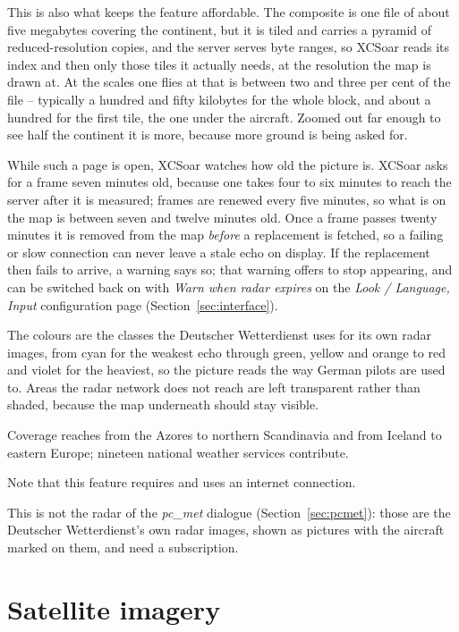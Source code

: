 This is also what keeps the feature affordable.  The composite is one
file of about five megabytes covering the continent, but it is
tiled and carries a pyramid of reduced-resolution copies, and the
server serves byte ranges, so XCSoar reads its index and then only
those tiles it actually needs, at the resolution the map is drawn at.
At the scales one flies at that is between two and three per cent of
the file -- typically a hundred and fifty kilobytes for the whole
block, and about a hundred for the first tile, the one under the
aircraft.  Zoomed out far enough to see half the continent it is more,
because more ground is being asked for.

While such a page is open, XCSoar watches how old the picture is.
XCSoar asks for a frame seven minutes old, because one takes four to
six minutes to reach the server after it is measured; frames are
renewed every five minutes, so what is on the map is between seven and
twelve minutes old.  Once a frame passes twenty minutes it is removed
from the map \emph{before} a replacement is fetched, so a failing or
slow connection can never leave a stale echo on display.  If the
replacement then fails to arrive, a warning says so; that warning
offers to stop appearing, and can be switched back on with
\emph{Warn when radar expires} on the \emph{Look / Language, Input}
configuration page (Section~\ref{sec:interface}).

The colours are the classes the Deutscher Wetterdienst uses for its
own radar images, from cyan for the weakest echo through green,
yellow and orange to red and violet for the heaviest, so the picture
reads the way German pilots are used to.  Areas the radar network
does not reach are left transparent rather than shaded, because the
map underneath should stay visible.

Coverage reaches from the Azores to northern Scandinavia and from
Iceland to eastern Europe; nineteen national weather services
contribute.

Note that this feature requires and uses an internet connection.

This is not the radar of the \emph{pc\_met} dialogue
(Section~\ref{sec:pcmet}): those are the Deutscher Wetterdienst's own
radar images, shown as pictures with the aircraft marked on them, and
need a subscription.

\section{Satellite imagery}\label{sec:satellite}

